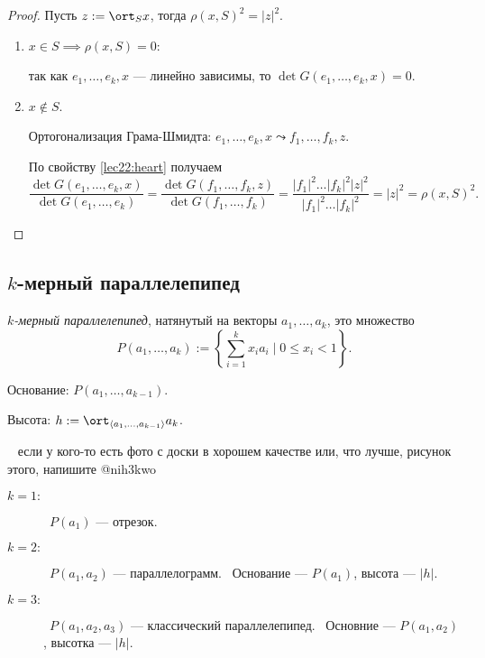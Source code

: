 \begin{proof}
    Пусть $z := \ort_S x$, тогда $\rho(x, S)^2 = |z|^2$.

    \begin{enumerate}
    \item $x \in S \implies \rho(x, S) = 0$:

        так как $e_1, \dots, e_k, x$ --- линейно зависимы, то $\det G(e_1, \dots, e_k, x) = 0$.

    \item $x \not\in S$.

        Ортогонализация Грама-Шмидта: $e_1, \dots, e_k, x \leadsto f_1, \dots, f_k, z$.

        По свойству \ref{lec22:heart} получаем
        \begin{equation*}
            \dfrac{\det G(e_1, \dots, e_k, x)}{\det G(e_1, \dots, e_k)} = \dfrac{\det G(f_1, \dots, f_k, z)}{\det G(f_1, \dots, f_k)} = \frac{|f_1|^2 \dots |f_k|^2 |z|^2}{|f_1|^2 \dots |f_k|^2} = |z|^2 = \rho(x, S)^2
        .\end{equation*}
    \end{enumerate}
\end{proof}


\subsection{$k$-мерный параллелепипед}

\begin{definition}
    \textit{$k$-мерный параллелепипед}, натянутый на векторы $a_1, \dots, a_k$, это множество
    \begin{equation*}
        P(a_1, \dots, a_k) := \left\{ \sum_{i = 1}^{k} x_i a_i \mid 0 \leq x_i < 1 \right\}
    .\end{equation*}

    Основание: $P(a_1, \dots, a_{k - 1})$.

    Высота: $h := \ort_{\left< a_1, \dots, a_{k - 1} \right>} a_k$.
\end{definition}

\begin{example}~
    {\tiny если у кого-то есть фото с доски в хорошем качестве или, что лучше, рисунок этого, напишите @nih3kwo}
    \begin{description}
    \item[$k = 1 \colon$] \  $P(a_1)$ --- отрезок.
    \item[$k = 2 \colon$] \ $P(a_1, a_2)$ --- параллелограмм. \  Основание --- $P(a_1)$, высота --- $|h|$.
    \item[$k = 3 \colon$] \ $P(a_1, a_2, a_3)$ --- классический параллелепипед. \ Основние --- $P(a_1, a_2)$, высотка --- $|h|$. 
    \end{description}
\end{example}


